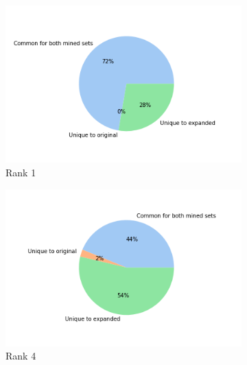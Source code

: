 \begin{figure}[htbp]
        \centering
        \begin{subfigure}[b]{0.3\textwidth}
            \centering
            \includegraphics[width=\textwidth]{figures/results/ranks/pie_charts/('rank_cutoff', 1)_family.png}
            \caption[]%
            {{\small Rank 1}}    
            \label{fig:rank_1_pie_family}
        \end{subfigure}
        \begin{subfigure}[b]{0.3\textwidth}  
            \centering 
            \includegraphics[width=\textwidth]{figures/results/ranks/pie_charts/('rank_cutoff', 4)_family.png}
            \caption[]%
            {{\small Rank 4}}    
            \label{fig:rank_4_pie_family}
        \end{subfigure}
        \begin{subfigure}[b]{0.3\textwidth}   

\end{subfigure}
\end{figure}
